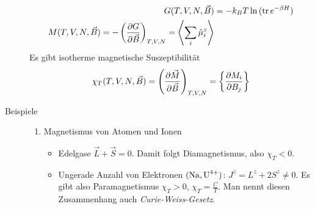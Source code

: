 \begin{description}
    \begin{align*}
      G(T, V, N, \vec{B}) & = - k_B T \ln{( \operatorname{tr}e ^{-\beta H})}\\
      M(T, V, N, \vec{B}) = - \left( \frac{\partial G }{\partial \vec{B}} \right)_{T, V, N} = 
      \Braket{
        \sum_{i}^{} \hat{\mu}_i^z
      }
    \end{align*}
    Es gibt isotherme magnetische Suszeptibilität
    \begin{align*}
      \chi_T(T, V, N, \vec{B}) = \left( \frac{\partial \vec{M} }{\partial \vec{B}} \right)_{T, V, N}
      = \left\{ \frac{\partial M_i }{\partial B_j} \right\}
    \end{align*}
  \item[Beispiele]
    \begin{enumerate}[1)]
      \item Magnetismus von Atomen und Ionen
        \begin{itemize}
          \item Edelgase $\vec{L} + \vec{S} = 0$. Damit folgt Diamagnetismus, also
            $\chi_T < 0$.
          \item Ungerade Anzahl von Elektronen $( \ce{Na}, \ce{U^{4+}})$:
            $J^z = L^z + 2 S^z \neq 0$. Es gibt also Paramagnetismus
            $\chi_T > 0$, $\chi_T = \frac{C}{T}$. Man nennt diesen Zusammenhang
            auch \emph{Curie-Weiss-Gesetz}.
        \end{itemize}


\end{enumerate}
\end{description}
